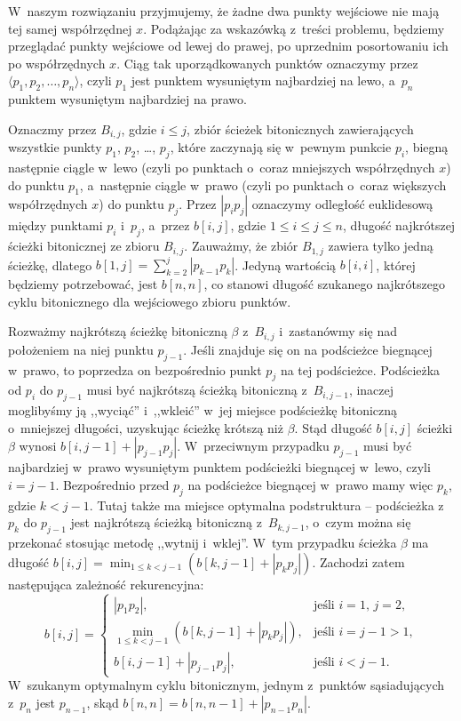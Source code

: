 W~naszym rozwiązaniu przyjmujemy, że żadne dwa punkty wejściowe nie mają tej samej współrzędnej $x$.
Podążając za wskazówką z~treści problemu, będziemy przeglądać punkty wejściowe od lewej do prawej, po uprzednim posortowaniu ich po współrzędnych $x$.
Ciąg tak uporządkowanych punktów oznaczymy przez $\langle p_1,p_2,\dots,p_n\rangle$, czyli $p_1$ jest punktem wysuniętym najbardziej na lewo, a~$p_n$ punktem wysuniętym najbardziej na prawo.

Oznaczmy przez $B_{i,j}$, gdzie $i\le j$, zbiór ścieżek bitonicznych zawierających wszystkie punkty $p_1$, $p_2$, \dots, $p_j$, które zaczynają się w~pewnym punkcie $p_i$, biegną następnie ciągle w~lewo (czyli po punktach o~coraz mniejszych współrzędnych $x$) do punktu $p_1$, a~następnie ciągle w~prawo (czyli po punktach o~coraz większych współrzędnych $x$) do punktu $p_j$.
Przez $|p_ip_j|$ oznaczymy odległość euklidesową między punktami $p_i$ i~$p_j$, a~przez $b[i,j]$, gdzie $1\le i\le j\le n$, długość najkrótszej ścieżki bitonicznej ze zbioru $B_{i,j}$.
Zauważmy, że zbiór $B_{1,j}$ zawiera tylko jedną ścieżkę, dlatego $b[1,j]=\sum_{k=2}^j|p_{k-1}p_k|$.
Jedyną wartością $b[i,i]$, której będziemy potrzebować, jest $b[n,n]$, co stanowi długość szukanego najkrótszego cyklu bitonicznego dla wejściowego zbioru punktów.

Rozważmy najkrótszą ścieżkę bitoniczną $\beta$ z~$B_{i,j}$ i~zastanówmy się nad położeniem na niej punktu $p_{j-1}$.
Jeśli znajduje się on na podścieżce biegnącej w~prawo, to poprzedza on bezpośrednio punkt $p_j$ na tej podścieżce.
Podścieżka od $p_i$ do $p_{j-1}$ musi być najkrótszą ścieżką bitoniczną z~$B_{i,j-1}$, inaczej moglibyśmy ją ,,wyciąć'' i~,,wkleić'' w~jej miejsce podścieżkę bitoniczną o~mniejszej długości, uzyskując ścieżkę krótszą niż $\beta$.
Stąd długość $b[i,j]$ ścieżki $\beta$ wynosi $b[i,j-1]+|p_{j-1}p_j|$.
W~przeciwnym przypadku $p_{j-1}$ musi być najbardziej w~prawo wysuniętym punktem podścieżki biegnącej w~lewo, czyli $i=j-1$.
Bezpośrednio przed $p_j$ na podścieżce biegnącej w~prawo mamy więc $p_k$, gdzie $k<j-1$.
Tutaj także ma miejsce optymalna podstruktura -- podścieżka z~$p_k$ do $p_{j-1}$ jest najkrótszą ścieżką bitoniczną z~$B_{k,j-1}$, o~czym można się przekonać stosując metodę ,,wytnij i~wklej''.
W~tym przypadku ścieżka $\beta$ ma długość $b[i,j]=\min_{1\le k<j-1}(b[k,j-1]+|p_kp_j|)$.
Zachodzi zatem następująca zależność rekurencyjna:
\[
	b[i,j] = \begin{cases}
		|p_1p_2|, & \text{jeśli $i=1$, $j=2$}, \\
		\displaystyle\min_{1\le k<j-1}(b[k,j-1]+|p_kp_j|), & \text{jeśli $i=j-1>1$}, \\
		b[i,j-1]+|p_{j-1}p_j|, & \text{jeśli $i<j-1$}.
	\end{cases}
\]
W~szukanym optymalnym cyklu bitonicznym, jednym z~punktów sąsiadujących z~$p_n$ jest $p_{n-1}$, skąd $b[n,n]=b[n,n-1]+|p_{n-1}p_n|$.

